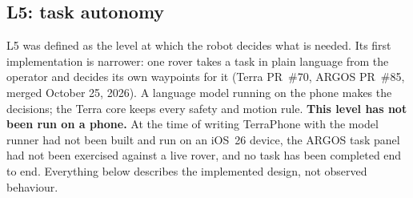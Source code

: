 \subsection{L5: task autonomy}
\label{sec:auto-l5}

L5 was defined as the level at which the robot decides what is needed.
Its first implementation is narrower: one rover takes a task in plain language from the operator and decides its own waypoints for it (Terra PR~\#70, ARGOS PR~\#85, merged October 25, 2026).
A language model running on the phone makes the decisions; the Terra core keeps every safety and motion rule.
\textbf{This level has not been run on a phone.}
At the time of writing TerraPhone with the model runner had not been built and run on an iOS~26 device, the ARGOS task panel had not been exercised against a live rover, and no task has been completed end to end.
Everything below describes the implemented design, not observed behaviour.

